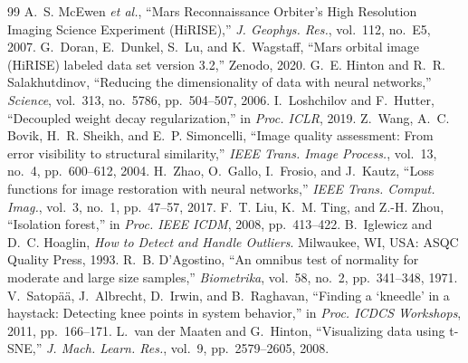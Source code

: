 \documentclass[conference]{IEEEtran}
\begin{document}
\begin{thebibliography}{99}
 A.~S. McEwen \emph{et al.}, ``Mars Reconnaissance Orbiter's High Resolution Imaging Science Experiment (HiRISE),'' \emph{J. Geophys. Res.}, vol.~112, no.~E5, 2007.
 G.~Doran, E.~Dunkel, S.~Lu, and K.~Wagstaff, ``Mars orbital image (HiRISE) labeled data set version 3.2,'' Zenodo, 2020.
 G.~E. Hinton and R.~R. Salakhutdinov, ``Reducing the dimensionality of data with neural networks,'' \emph{Science}, vol.~313, no.~5786, pp.~504--507, 2006.
 I.~Loshchilov and F.~Hutter, ``Decoupled weight decay regularization,'' in \emph{Proc. ICLR}, 2019.
 Z.~Wang, A.~C. Bovik, H.~R. Sheikh, and E.~P. Simoncelli, ``Image quality assessment: From error visibility to structural similarity,'' \emph{IEEE Trans. Image Process.}, vol.~13, no.~4, pp.~600--612, 2004.
 H.~Zhao, O.~Gallo, I.~Frosio, and J.~Kautz, ``Loss functions for image restoration with neural networks,'' \emph{IEEE Trans. Comput. Imag.}, vol.~3, no.~1, pp.~47--57, 2017.
 F.~T. Liu, K.~M. Ting, and Z.-H. Zhou, ``Isolation forest,'' in \emph{Proc. IEEE ICDM}, 2008, pp.~413--422.
 B.~Iglewicz and D.~C. Hoaglin, \emph{How to Detect and Handle Outliers}. Milwaukee, WI, USA: ASQC Quality Press, 1993.
 R.~B. D'Agostino, ``An omnibus test of normality for moderate and large size samples,'' \emph{Biometrika}, vol.~58, no.~2, pp.~341--348, 1971.
 V.~Satop\"a\"a, J.~Albrecht, D.~Irwin, and B.~Raghavan, ``Finding a `kneedle' in a haystack: Detecting knee points in system behavior,'' in \emph{Proc. ICDCS Workshops}, 2011, pp.~166--171.
 L.~van der Maaten and G.~Hinton, ``Visualizing data using t-SNE,'' \emph{J. Mach. Learn. Res.}, vol.~9, pp.~2579--2605, 2008.
\end{thebibliography}
\end{document}
